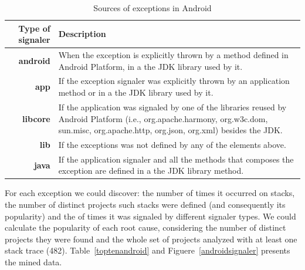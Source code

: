 \documentclass[conference]{IEEEtran}
\begin{document}
\begin{table}
  \centering
  \begin{tabular}{rp{22em}}
    \hline
    \bfseries{Type of signaler} & \bfseries{Description} \\
    \hline
    \bfseries{android} & When the exception is explicitly thrown by a method defined in Android Platform, in a the JDK library used by it.\\
    \bfseries{app}     & If the exception signaler was explicitly thrown by an application method or in a the JDK library used by it.\\
    \bfseries{libcore} & If the application was signaled by one of the libraries reused by Android Platform (i.e., org.apache.harmony, org.w3c.dom, sun.misc, org.apache.http, org.json, org.xml) besides the JDK. \\
    \bfseries{lib}     & If the exceptions was not defined by any of the elements above.\\
    \bfseries{java}    & If the application signaler and all the methods that composes the exception are defined in a the JDK library method.\\
    \hline
  \end{tabular}
  \caption{Sources of exceptions in Android}
  \label{tab:signalers}
\end{table}

For each exception we could discover: the number of times it occurred on stacks,
the number of distinct projects such stacks were defined (and consequently its
popularity) and the of times it was signaled by different signaler types. We
could calculate the popularity of each root cause, considering the number of
distinct projects they were found and the whole set of projects analyzed with at
least one stack trace (482). Table~\ref{toptenandroid} and
Figuere~\ref{androidsignaler} presents the mined data.
\end{document}
